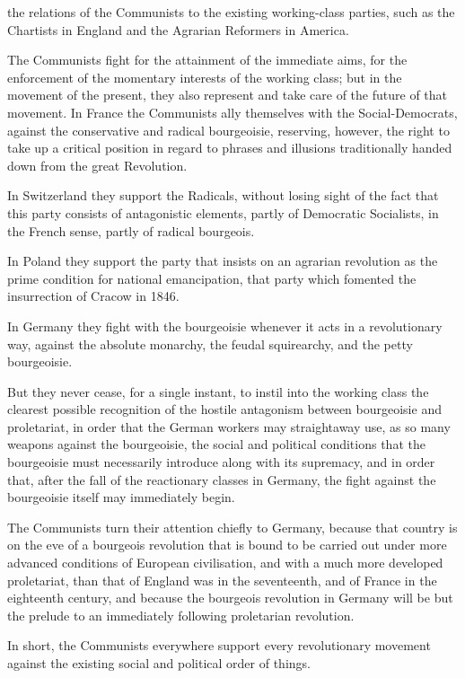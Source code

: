  the relations of the Communists to the
existing working-class parties, such as the Chartists in England and
the Agrarian Reformers in America.

The Communists fight for the attainment of the immediate aims, for the
enforcement of the momentary interests of the working class; but in the
movement of the present, they also represent and take care of the
future of that movement. In France the Communists ally themselves with
the Social-Democrats, against the conservative and radical bourgeoisie,
reserving, however, the right to take up a critical position in regard
to phrases and illusions traditionally handed down from the great
Revolution.

In Switzerland they support the Radicals, without losing sight of the
fact that this party consists of antagonistic elements, partly of
Democratic Socialists, in the French sense, partly of radical
bourgeois.

In Poland they support the party that insists on an agrarian revolution
as the prime condition for national emancipation, that party which
fomented the insurrection of Cracow in 1846.

In Germany they fight with the bourgeoisie whenever it acts in a
revolutionary way, against the absolute monarchy, the feudal
squirearchy, and the petty bourgeoisie.

But they never cease, for a single instant, to instil into the working
class the clearest possible recognition of the hostile antagonism
between bourgeoisie and proletariat, in order that the German workers
may straightaway use, as so many weapons against the bourgeoisie, the
social and political conditions that the bourgeoisie must necessarily
introduce along with its supremacy, and in order that, after the fall
of the reactionary classes in Germany, the fight against the
bourgeoisie itself may immediately begin.

The Communists turn their attention chiefly to Germany, because that
country is on the eve of a bourgeois revolution that is bound to be
carried out under more advanced conditions of European civilisation,
and with a much more developed proletariat, than that of England was in
the seventeenth, and of France in the eighteenth century, and because
the bourgeois revolution in Germany will be but the prelude to an
immediately following proletarian revolution.

In short, the Communists everywhere support every revolutionary
movement against the existing social and political order of things.

